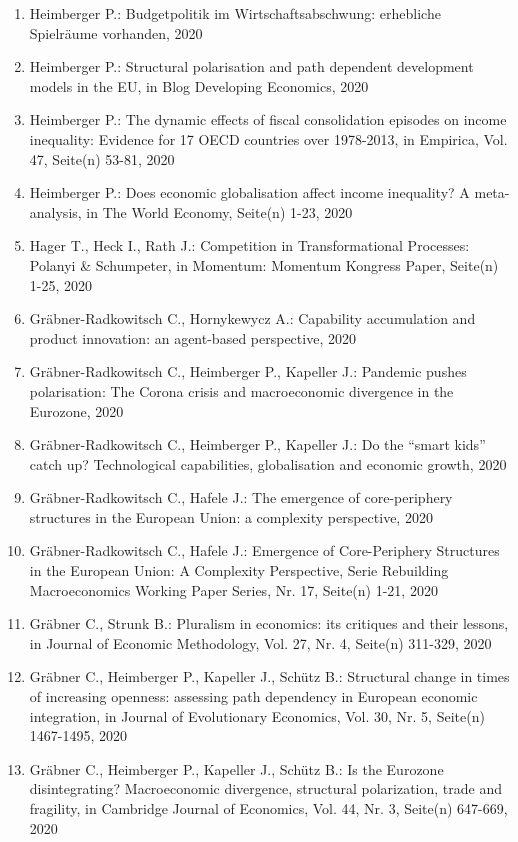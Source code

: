 \begin{enumerate}
	 \item Heimberger P.: Budgetpolitik im Wirtschaftsabschwung: erhebliche Spielräume vorhanden, 2020
	 \item Heimberger P.: Structural polarisation and path dependent development models in the EU, in Blog Developing Economics, 2020
	 \item Heimberger P.: The dynamic effects of fiscal consolidation episodes on income inequality: Evidence for 17 OECD countries over 1978-2013, in Empirica, Vol. 47, Seite(n) 53-81, 2020
	 \item Heimberger P.: Does economic globalisation affect income inequality? A meta-analysis, in The World Economy, Seite(n) 1-23, 2020
	 \item Hager T., Heck I., Rath J.: Competition in Transformational Processes: Polanyi \& Schumpeter, in Momentum: Momentum Kongress Paper, Seite(n) 1-25, 2020
	 \item Gräbner-Radkowitsch C., Hornykewycz A.: Capability accumulation and product innovation: an agent-based perspective, 2020
	 \item Gräbner-Radkowitsch C., Heimberger P., Kapeller J.: Pandemic pushes polarisation: The Corona crisis and macroeconomic divergence in the Eurozone, 2020
	 \item Gräbner-Radkowitsch C., Heimberger P., Kapeller J.: Do the “smart kids” catch up? Technological capabilities, globalisation and economic growth, 2020
	 \item Gräbner-Radkowitsch C., Hafele J.: The emergence of core-periphery structures in the European Union: a complexity perspective, 2020
	 \item Gräbner-Radkowitsch C., Hafele J.: Emergence of Core-Periphery Structures in the European Union: A Complexity Perspective, Serie Rebuilding Macroeconomics Working Paper Series, Nr. 17, Seite(n) 1-21, 2020
	 \item Gräbner C., Strunk B.: Pluralism in economics: its critiques and their lessons, in Journal of Economic Methodology, Vol. 27, Nr. 4, Seite(n) 311-329, 2020
	 \item Gräbner C., Heimberger P., Kapeller J., Schütz B.: Structural change in times of increasing openness: assessing path dependency in European economic integration, in Journal of Evolutionary Economics, Vol. 30, Nr. 5, Seite(n) 1467-1495, 2020
	 \item Gräbner C., Heimberger P., Kapeller J., Schütz B.: Is the Eurozone disintegrating? Macroeconomic divergence, structural polarization, trade and fragility, in Cambridge Journal of Economics, Vol. 44, Nr. 3, Seite(n) 647-669, 2020

\end{enumerate}
